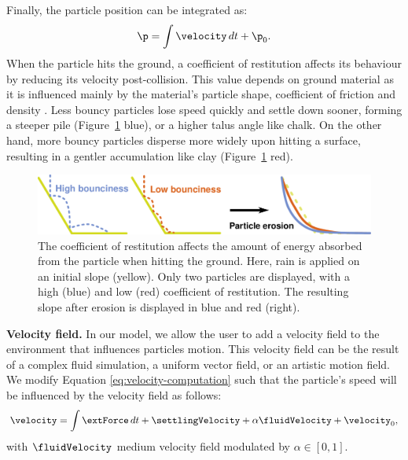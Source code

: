 Finally, the particle position can be integrated as: 
\begin{align} \nonumber
\p = \int{ \velocity \, dt} + \p_0.
\end{align}
When the particle hits the ground, a coefficient of restitution affects its behaviour by reducing its velocity post-collision. This value depends on ground material as it is influenced mainly by the material's particle shape, coefficient of friction and density \cite{Yan2020}. Less bouncy particles lose speed quickly and settle down sooner, forming a steeper pile (Figure~\ref{fig:erosion_coefficient of restitution-diagram} blue), or a higher talus angle like chalk. On the other hand, more bouncy particles disperse more widely upon hitting a surface, resulting in a gentler accumulation like clay (Figure~\ref{fig:erosion_coefficient of restitution-diagram} red).
\begin{figure}
\centering
\includegraphics{figures/bounciness.pdf}
\caption{The coefficient of restitution affects the amount of energy absorbed from the particle when hitting the ground. Here, rain is applied on an initial slope (yellow). Only two particles are displayed, with a high (blue) and low (red) coefficient of restitution. The resulting slope after erosion is displayed in blue and red (right). }
\label{fig:erosion_coefficient of restitution-diagram}

\end{figure}

\textbf{Velocity field.}
\label{sec:erosion_velocity_field_refinement}
In our model, we allow the user to add a velocity field to the environment that influences particles motion. This velocity field can be the result of a complex fluid simulation, a uniform vector field, or an artistic motion field.
We modify Equation \eqref{eq:velocity-computation} such that the particle's speed will be influenced by the velocity field as follows:
\begin{align} \label{eq:velocity-computation-final}
\velocity = \int{ \extForce \, dt} + \settlingVelocity + \alpha \fluidVelocity + \velocity_0,
\end{align}
with $\fluidVelocity$ medium velocity field modulated by $\alpha \in [0,1]$. 

